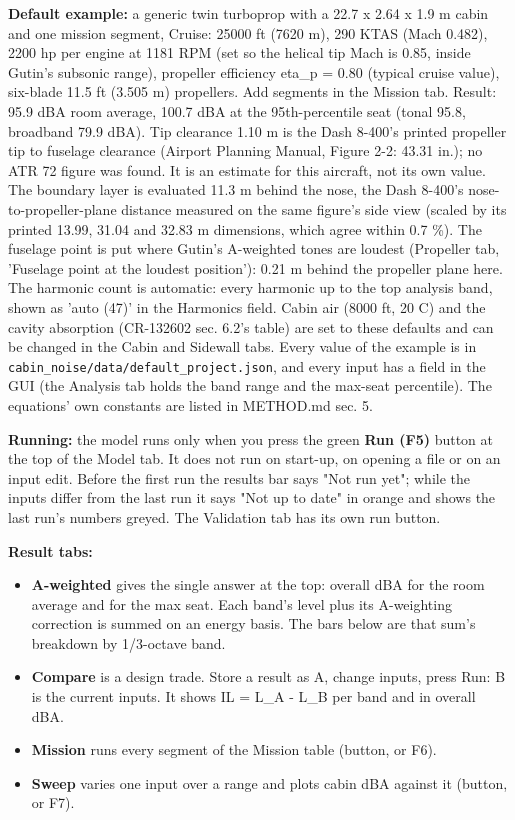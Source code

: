 \documentclass[10pt,a4paper]{article}
\begin{document}
\textbf{Default example:} a generic twin turboprop with a 22.7 x 2.64 x 1.9 m cabin and one mission segment, Cruise: 25000 ft (7620 m), 290 KTAS (Mach 0.482), 2200 hp per engine at 1181 RPM (set so the helical tip Mach is 0.85, inside Gutin's subsonic range), propeller efficiency eta\_p = 0.80 (typical cruise value), six-blade 11.5 ft (3.505 m) propellers. Add segments in the Mission tab. Result: 95.9 dBA room average, 100.7 dBA at the 95th-percentile seat (tonal 95.8, broadband 79.9 dBA). Tip clearance 1.10 m is the Dash 8-400's printed propeller tip to fuselage clearance (Airport Planning Manual, Figure 2-2: 43.31 in.); no ATR 72 figure was found. It is an estimate for this aircraft, not its own value. The boundary layer is evaluated 11.3 m behind the nose, the Dash 8-400's nose-to-propeller-plane distance measured on the same figure's side view (scaled by its printed 13.99, 31.04 and 32.83 m dimensions, which agree within 0.7 \%). The fuselage point is put where Gutin's A-weighted tones are loudest (Propeller tab, 'Fuselage point at the loudest position'): 0.21 m behind the propeller plane here. The harmonic count is automatic: every harmonic up to the top analysis band, shown as 'auto (47)' in the Harmonics field. Cabin air (8000 ft, 20 C) and the cavity absorption (CR-132602 sec. 6.2's table) are set to these defaults and can be changed in the Cabin and Sidewall tabs. Every value of the example is in \texttt{cabin\_\allowbreak{}noise/\allowbreak{}data/\allowbreak{}default\_\allowbreak{}project.\allowbreak{}json}, and every input has a field in the GUI (the Analysis tab holds the band range and the max-seat percentile). The equations' own constants are listed in METHOD.md sec. 5.

\textbf{Running:} the model runs only when you press the green \textbf{Run (F5)} button at the top of the Model tab. It does not run on start-up, on opening a file or on an input edit. Before the first run the results bar says "Not run yet"; while the inputs differ from the last run it says "Not up to date" in orange and shows the last run's numbers greyed. The Validation tab has its own run button.

\textbf{Result tabs:}

\begin{itemize}
\item \textbf{A-weighted} gives the single answer at the top: overall dBA for the room average and for the max seat. Each band's level plus its A-weighting correction is summed on an energy basis. The bars below are that sum's breakdown by 1/3-octave band.
\item \textbf{Compare} is a design trade. Store a result as A, change inputs, press Run: B is the current inputs. It shows IL = L\_A - L\_B per band and in overall dBA.
\item \textbf{Mission} runs every segment of the Mission table (button, or F6).
\item \textbf{Sweep} varies one input over a range and plots cabin dBA against it (button, or F7).
\end{itemize}
\end{document}
